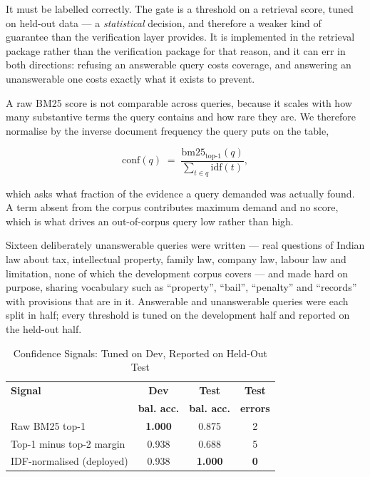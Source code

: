 \documentclass[conference]{IEEEtran}
\begin{document}
It must be labelled correctly. The gate is a threshold on a retrieval score,
tuned on held-out data --- a \emph{statistical} decision, and therefore a weaker
kind of guarantee than the verification layer provides. It is implemented in the
retrieval package rather than the verification package for that reason, and it
can err in both directions: refusing an answerable query costs coverage, and
answering an unanswerable one costs exactly what it exists to prevent.

A raw BM25 score is not comparable across queries, because it scales with how
many substantive terms the query contains and how rare they are. We therefore
normalise by the inverse document frequency the query puts on the table,

\[
\mathrm{conf}(q) \;=\; \frac{\mathrm{bm25}_{\text{top-1}}(q)}
                            {\sum_{t \in q} \mathrm{idf}(t)},
\]

which asks what fraction of the evidence a query demanded was actually found. A
term absent from the corpus contributes maximum demand and no score, which is
what drives an out-of-corpus query low rather than high.

Sixteen deliberately unanswerable queries were written --- real questions of
Indian law about tax, intellectual property, family law, company law, labour law
and limitation, none of which the development corpus covers --- and made hard on
purpose, sharing vocabulary such as ``property'', ``bail'', ``penalty'' and
``records'' with provisions that are in it. Answerable and unanswerable queries
were each split in half; every threshold is tuned on the development half and
reported on the held-out half.

\begin{table}[t]
\caption{Confidence Signals: Tuned on Dev, Reported on Held-Out Test}
\label{tab:confidence}
\centering
\footnotesize
\begin{tabular}{@{}lccc@{}}
\toprule
\textbf{Signal} & \textbf{Dev} & \textbf{Test} & \textbf{Test} \\
                & \textbf{bal. acc.} & \textbf{bal. acc.} & \textbf{errors} \\
\midrule
Raw BM25 top-1            & \textbf{1.000} & 0.875 & 2 \\
Top-1 minus top-2 margin  & 0.938 & 0.688 & 5 \\
IDF-normalised (deployed) & 0.938 & \textbf{1.000} & \textbf{0} \\
\bottomrule
\end{tabular}
\end{table}
\end{document}
